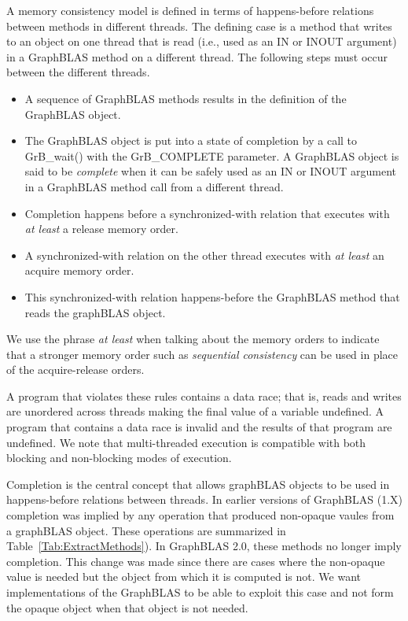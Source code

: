 A memory consistency model is defined in terms of happens-before relations between methods in different
threads.  The defining case is a method that writes to an object on one thread that is read (i.e., used as an 
IN or INOUT argument) in a GraphBLAS method on a different thread.  The following steps must occur 
between the different threads.
\begin{itemize}
\item A sequence of GraphBLAS methods results in the definition of the GraphBLAS object.
\item The GraphBLAS object is put into a state of completion by a call to {\sf GrB\_wait()} with
the {\sf GrB\_COMPLETE} parameter.  A GraphBLAS object is said to be 
\emph{complete} when it can be
safely used as an {\sf IN} or {\sf INOUT} argument in a 
GraphBLAS method call from a different thread. 
\item Completion happens before a synchronized-with relation that executes with \emph{at least} a release memory order.
\item A synchronized-with relation on the other thread executes with \emph{at least} an acquire memory order.
\item This synchronized-with relation happens-before the GraphBLAS method that reads the graphBLAS object.
\end{itemize}
We use the phrase \emph{at least} when talking about the memory orders to indicate that a stronger memory order such 
as \emph{sequential consistency} can be used in place of the acquire-release orders.

A program that violates these rules contains a data race; that is, reads and writes are unordered across
threads making the final value of a variable undefined.  A program that 
contains a data race is invalid and the results of that program are undefined.  
We note that multi-threaded execution is compatible with both blocking and non-blocking
modes of execution. 

Completion is the central concept that allows graphBLAS objects to be used in happens-before
relations between threads.  In earlier versions of GraphBLAS (1.X) completion was implied
by any operation that produced non-opaque vaules from a graphBLAS object.  These 
operations are summarized in  Table~\ref{Tab:ExtractMethods}).  In GraphBLAS 2.0, these 
methods no longer imply completion.  This change was made since there are cases where 
the non-opaque value is needed but the object from which it is computed is not. We
want implementations of the GraphBLAS to be able to exploit this case and not form the 
opaque object when that object is not needed.  

